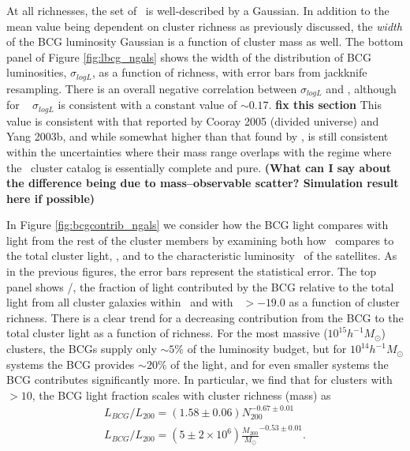 \documentclass{emulateapj}
\begin{document}
At all richnesses, the set of \Lbcg\ is well-described by a
Gaussian. In addition to the mean value being dependent on cluster
richness as previously discussed, the {\it width} of the BCG
luminosity Gaussian is a function of cluster mass as well. The bottom
panel of Figure \ref{fig:lbcg_ngals} shows the width of the
distribution of BCG luminosities, $\sigma_{log L}$, as a function of
richness, with error bars from jackknife resampling. There is an
overall negative correlation between $\sigma_{log L}$ and \Ntwo,
although for \Ntwo\  $\sigma_{log L}$ is consistent with a
constant value of $\sim 0.17$. {\bf fix this section} This value is consistent with that reported by Cooray 2005 (divided universe) and Yang 2003b, and while somewhat higher than that
found by \citet{ZCZ07}, is still consistent within the uncertainties
where their mass range overlaps with the regime where the
\maxbcg\ cluster catalog is essentially complete and pure. {\bf (What can I say about the difference being due to mass--observable scatter? Simulation result here if possible)}

In Figure \ref{fig:bcgcontrib_ngals} we consider how the BCG light
compares with light from the rest of the cluster members by examining
both how \Lbcg\ compares to the total cluster light, \deltalvir, and to the
characteristic luminosity \Lstarsat\ of the satellites. As in the
previous figures, the error bars represent the statistical error. The top panel shows \Lbcg/\deltalvir, the fraction of light
contributed by the BCG relative to the total light from all cluster
galaxies within \rtwo\ and with \Mi\ $> -19.0$ as a function of
cluster richness. There is a clear trend for a
decreasing contribution from the BCG to the total cluster light as a
function of richness. For the most massive ($10^{15} h^{-1}
M_{\odot}$) clusters, the BCGs supply only $\sim 5\%$ of the
luminosity budget, but for $10^{14} h^{-1} M_{\odot}$ systems the BCG
provides $\sim 20\%$ of the light, and for even smaller systems the
BCG contributes significantly more. In particular, we find that for clusters
with \Ntwo\ $> 10$, the BCG light fraction scales with cluster
richness (mass) as
\begin{eqnarray}
L_{BCG}/L_{200} = (1.58 \pm 0.06) N_{200}^{-0.67 \pm 0.01}\\
L_{BCG}/L_{200} = (5 \pm 2 \times 10^6) \frac{M_{200}}{M_{\odot}}^{-0.53 \pm 0.01}.
\end{eqnarray}
\end{document}
